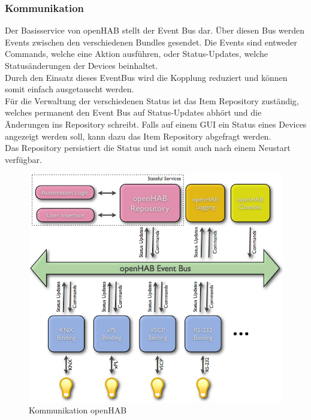 \subsubsection{Kommunikation}
Der Basisservice von openHAB stellt der Event Bus dar. Über diesen Bus werden Events zwischen den verschiedenen Bundles gesendet. Die Events sind entweder Commands, welche eine Aktion ausführen, oder Status-Updates, welche Statusänderungen der Devices beinhaltet. \\
Durch den Einsatz dieses EventBus wird die Kopplung reduziert und können somit einfach ausgetauscht werden. \\
Für die Verwaltung der verschiedenen Status ist das Item Repository zuständig, welches permanent den Event Bus auf Status-Updates abhört und die Änderungen ins Repository schreibt. Falls auf einem GUI ein Status eines Devices angezeigt werden soll, kann dazu das Item Repository abgefragt werden.\\
Das Repository persistiert die Status und ist somit auch nach einem Neustart verfügbar.

\begin{figure}[H]
	\centering
		\includegraphics[scale=0.4]{report/img/communicationOH}
	\caption{Kommunikation openHAB}
	\label{fig:ohComm}
\end{figure}

